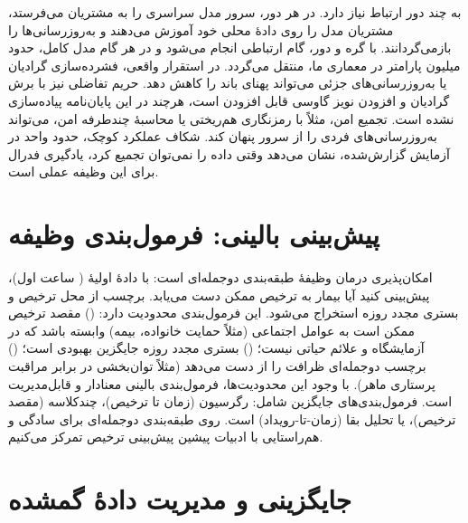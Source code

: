  به چند دور ارتباط نیاز دارد. در هر دور، سرور مدل سراسری را به مشتریان می‌فرستد، مشتریان مدل را روی دادۀ محلی خود آموزش می‌دهند و به‌روزرسانی‌ها را بازمی‌گردانند. با  گره و  دور،  گام ارتباطی انجام می‌شود و در هر گام مدل کامل، حدود  میلیون پارامتر در معماری ما، منتقل می‌گردد. در استقرار واقعی، فشرده‌سازی گرادیان یا به‌روزرسانی‌های جزئی می‌تواند پهنای باند را کاهش دهد. حریم تفاضلی نیز با برش گرادیان و افزودن نویز گاوسی قابل افزودن است، هرچند در این پایان‌نامه پیاده‌سازی نشده است. تجمیع امن، مثلاً با رمزنگاری هم‌ریختی یا محاسبۀ چندطرفه امن، می‌تواند به‌روزرسانی‌های فردی را از سرور پنهان کند. شکاف عملکرد کوچک، حدود  واحد  در آزمایش گزارش‌شده، نشان می‌دهد وقتی داده را نمی‌توان تجمیع کرد، یادگیری فدرال برای این وظیفه عملی است.

\section{پیش‌بینی بالینی: فرمول‌بندی وظیفه}

امکان‌پذیری درمان وظیفۀ طبقه‌بندی دوجمله‌ای است: با دادۀ اولیۀ  ( ساعت اول)، پیش‌بینی کنید آیا بیمار به ترخیص ممکن دست می‌یابد. برچسب از محل ترخیص و بستری مجدد  روزه استخراج می‌شود. این فرمول‌بندی محدودیت دارد: () مقصد ترخیص ممکن است به عوامل اجتماعی (مثلاً حمایت خانواده، بیمه) وابسته باشد که در آزمایشگاه و علائم حیاتی نیست؛ () بستری مجدد  روزه جایگزین بهبودی است؛ () برچسب دوجمله‌ای ظرافت را از دست می‌دهد (مثلاً توان‌بخشی در برابر مراقبت پرستاری ماهر). با وجود این محدودیت‌ها، فرمول‌بندی بالینی معنادار و قابل‌مدیریت است. فرمول‌بندی‌های جایگزین شامل: رگرسیون (زمان تا ترخیص)، چندکلاسه (مقصد ترخیص)، یا تحلیل بقا (زمان-تا-رویداد) است. روی طبقه‌بندی دوجمله‌ای برای سادگی و هم‌راستایی با ادبیات پیشین پیش‌بینی ترخیص تمرکز می‌کنیم.

\section{جایگزینی و مدیریت دادۀ گمشده}

